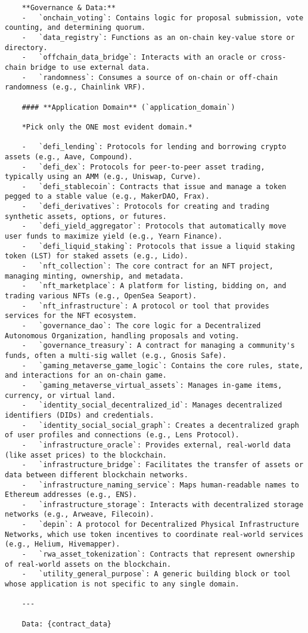 \begin{lstlisting}
    **Governance & Data:**
    -   `onchain_voting`: Contains logic for proposal submission, vote counting, and determining quorum.
    -   `data_registry`: Functions as an on-chain key-value store or directory.
    -   `offchain_data_bridge`: Interacts with an oracle or cross-chain bridge to use external data.
    -   `randomness`: Consumes a source of on-chain or off-chain randomness (e.g., Chainlink VRF).

    #### **Application Domain** (`application_domain`)

    *Pick only the ONE most evident domain.*

    -   `defi_lending`: Protocols for lending and borrowing crypto assets (e.g., Aave, Compound).
    -   `defi_dex`: Protocols for peer-to-peer asset trading, typically using an AMM (e.g., Uniswap, Curve).
    -   `defi_stablecoin`: Contracts that issue and manage a token pegged to a stable value (e.g., MakerDAO, Frax).
    -   `defi_derivatives`: Protocols for creating and trading synthetic assets, options, or futures.
    -   `defi_yield_aggregator`: Protocols that automatically move user funds to maximize yield (e.g., Yearn Finance).
    -   `defi_liquid_staking`: Protocols that issue a liquid staking token (LST) for staked assets (e.g., Lido).
    -   `nft_collection`: The core contract for an NFT project, managing minting, ownership, and metadata.
    -   `nft_marketplace`: A platform for listing, bidding on, and trading various NFTs (e.g., OpenSea Seaport).
    -   `nft_infrastructure`: A protocol or tool that provides services for the NFT ecosystem.
    -   `governance_dao`: The core logic for a Decentralized Autonomous Organization, handling proposals and voting.
    -   `governance_treasury`: A contract for managing a community's funds, often a multi-sig wallet (e.g., Gnosis Safe).
    -   `gaming_metaverse_game_logic`: Contains the core rules, state, and interactions for an on-chain game.
    -   `gaming_metaverse_virtual_assets`: Manages in-game items, currency, or virtual land.
    -   `identity_social_decentralized_id`: Manages decentralized identifiers (DIDs) and credentials.
    -   `identity_social_social_graph`: Creates a decentralized graph of user profiles and connections (e.g., Lens Protocol).
    -   `infrastructure_oracle`: Provides external, real-world data (like asset prices) to the blockchain.
    -   `infrastructure_bridge`: Facilitates the transfer of assets or data between different blockchain networks.
    -   `infrastructure_naming_service`: Maps human-readable names to Ethereum addresses (e.g., ENS).
    -   `infrastructure_storage`: Interacts with decentralized storage networks (e.g., Arweave, Filecoin).
    -   `depin`: A protocol for Decentralized Physical Infrastructure Networks, which use token incentives to coordinate real-world services (e.g., Helium, Hivemapper).
    -   `rwa_asset_tokenization`: Contracts that represent ownership of real-world assets on the blockchain.
    -   `utility_general_purpose`: A generic building block or tool whose application is not specific to any single domain.

    ---

    Data: {contract_data}
\end{lstlisting}